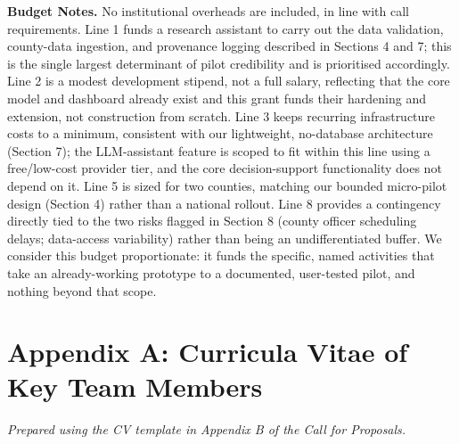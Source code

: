 \documentclass[12pt,a4paper]{article}
\begin{document}
\textbf{Budget Notes.} No institutional overheads are included, in line with call requirements. Line 1 funds a research assistant to carry out the data validation, county-data ingestion, and provenance logging described in Sections 4 and 7; this is the single largest determinant of pilot credibility and is prioritised accordingly. Line 2 is a modest development stipend, not a full salary, reflecting that the core model and dashboard already exist and this grant funds their hardening and extension, not construction from scratch. Line 3 keeps recurring infrastructure costs to a minimum, consistent with our lightweight, no-database architecture (Section 7); the LLM-assistant feature is scoped to fit within this line using a free/low-cost provider tier, and the core decision-support functionality does not depend on it. Line 5 is sized for two counties, matching our bounded micro-pilot design (Section 4) rather than a national rollout. Line 8 provides a contingency directly tied to the two risks flagged in Section 8 (county officer scheduling delays; data-access variability) rather than being an undifferentiated buffer. We consider this budget proportionate: it funds the specific, named activities that take an already-working prototype to a documented, user-tested pilot, and nothing beyond that scope.

\newpage
\section*{Appendix A: Curricula Vitae of Key Team Members}
\textit{Prepared using the CV template in Appendix B of the Call for Proposals.}
\end{document}
